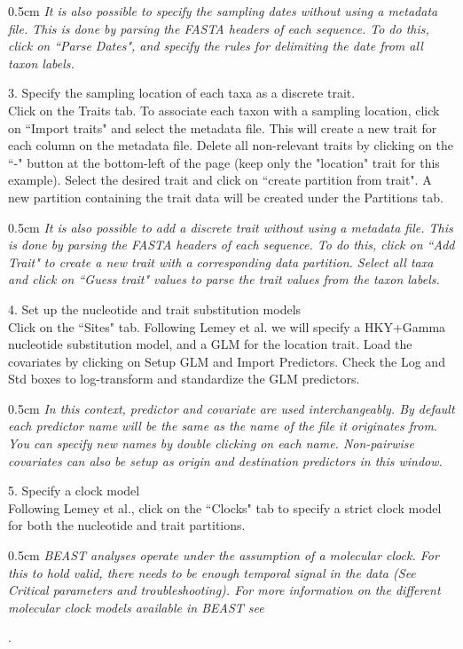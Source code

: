 \documentclass{article}
\newcommand{\ann}[1]{
\begin{adjustwidth}{0.5cm}{}
\it{#1}\\
\end{adjustwidth}}
\newcommand{\code}[1]{
{\upshape\ttfamily{#1}}}
\begin{document}
\ann{It is also possible to specify the sampling dates without using a metadata file. This is done by parsing the FASTA headers of each sequence. To do this, click on ``Parse Dates", and specify the rules for delimiting the date from all taxon labels.}

3. Specify the sampling location of each taxa as a discrete trait.\\

Click on the Traits tab. To associate each taxon with a sampling location, click on ``Import traits" and select the metadata file. This will create a new trait for each column on the metadata file. Delete all non-relevant traits by clicking on the ``-" button at the bottom-left of the page (keep only the "location" trait for this example). Select the desired trait and click on ``create partition from trait". A new partition containing the trait data will be created under the Partitions tab.\\

\ann{It is also possible to add a discrete trait without using a metadata file. This is done by parsing the FASTA headers of each sequence. To do this, click on ``Add Trait" to create a new trait with a corresponding data partition. Select all taxa and click on ``Guess trait" values to parse the trait values from the taxon labels.}

4. Set up the nucleotide and trait substitution models\\

Click on the ``Sites" tab. Following Lemey et al. we will specify a HKY+Gamma nucleotide substitution model, and a GLM for the location trait. Load the covariates by clicking on Setup GLM and Import Predictors. Check the Log and Std boxes to log-transform and standardize the GLM predictors.\\

\ann{In this context, predictor and covariate are used interchangeably. By default each predictor name will be the same as the name of the file it originates from. You can specify new names by double clicking on each name. Non-pairwise covariates can also be setup as origin and destination predictors in this window.}

5. Specify a clock model\\

Following Lemey et al., click on the ``Clocks" tab to specify a strict clock model for both the nucleotide and trait partitions.\\

\ann{BEAST analyses operate under the assumption of a molecular clock. For this to hold valid, there needs to be enough temporal signal in the data (See Critical parameters and troubleshooting). For more information on the different molecular clock models available in BEAST see \code{http://beast.community/clocks}}.\\
\end{document}
